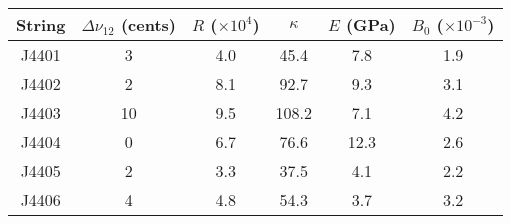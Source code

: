 \begin{tabular}{cccccc}
\toprule
String &  $\Delta \nu_{12}$ (cents) &  $R$ ($\times 10^4$) &  $\kappa$ &  $E$ (GPa) &  $B_0$ ($\times 10^{-3}$) \\
\midrule
 J4401 &                          3 &                  4.0 &      45.4 &        7.8 &                       1.9 \\
 J4402 &                          2 &                  8.1 &      92.7 &        9.3 &                       3.1 \\
 J4403 &                         10 &                  9.5 &     108.2 &        7.1 &                       4.2 \\
 J4404 &                          0 &                  6.7 &      76.6 &       12.3 &                       2.6 \\
 J4405 &                          2 &                  3.3 &      37.5 &        4.1 &                       2.2 \\
 J4406 &                          4 &                  4.8 &      54.3 &        3.7 &                       3.2 \\
\bottomrule
\end{tabular}

